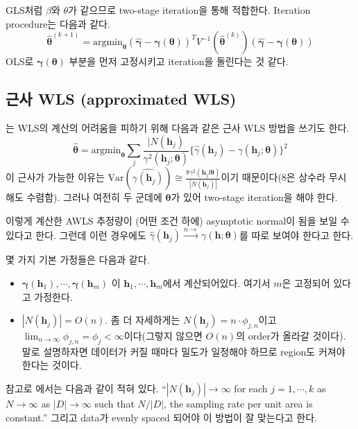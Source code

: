 \documentclass[b5paper,]{scrbook}
\theoremstyle{plain}
\theoremstyle{definition}
\numberwithin{equation}{section}
\begin{document}
GLS처럼 \(\beta\)와 \(\theta\)가 같으므로 two-stage iteration을 통해 적합한다. Iteration procedure는 다음과 같다.
\[\hat{\boldsymbol{\theta}}^{(k+1)}=\text{argmin}_{\boldsymbol{\theta}}(\hat{\boldsymbol{\gamma}}-\boldsymbol{\gamma}(\boldsymbol{\theta}))^{T}V^{-1}(\hat{\boldsymbol{\theta}}^{(k)})(\hat{\boldsymbol{\gamma}}-\boldsymbol{\gamma}(\boldsymbol{\theta}))\]
OLS로 \(\boldsymbol{\gamma}(\boldsymbol{\theta})\) 부분을 먼저 고정시키고 iteration을 돌린다는 것 같다.

\hypertarget{-wls-approximated-wls}{%
\subsection{근사 WLS (approximated WLS)}\label{-wls-approximated-wls}}

\citep{Cressie1985}는 WLS의 계산의 어려움을 피하기 위해 다음과 같은 근사 WLS 방법을 쓰기도 한다.
\[\hat{\boldsymbol{\theta}}=\text{argmin}_{\boldsymbol{\theta}}\sum_{j}\frac{|N(\mathbf{h}_{j})}{\gamma^{2}(\mathbf{h}_{j};\boldsymbol{\theta})}\{ \hat{\gamma}(\mathbf{h}_{j})-\gamma(\mathbf{h}_{j};\boldsymbol{\theta}) \}^{2}\]
이 근사가 가능한 이유는 \(\text{Var}(\hat{\gamma(\mathbf{h}_{j})}) \cong \frac{8 \gamma^{2}(\mathbf{h}_{j}l\boldsymbol{\theta})}{|N(\mathbf{h}_{j})|}\)이기 때문이다(8은 상수라 무시해도 수렴함). 그러나 여전히 두 군데에 \(\boldsymbol{\theta}\)가 있어 two-stage iteration을 해야 한다.

이렇게 계산한 AWLS 추정량이 (어떤 조건 하에) asymptotic normal이 됨을 보일 수 있다고 한다. 그런데 이런 경우에도 \(\hat{\gamma}(\mathbf{h}_{j}) \stackrel{n \rightarrow}{\rightarrow} \gamma(\mathbf{h};\boldsymbol{\theta})\)를 따로 보여야 한다고 한다.

몇 가지 기본 가정들은 다음과 같다.

\begin{itemize}
\item
  \(\mathbf{\gamma}(\mathbf{h}_{1}), \cdots , \mathbf{\gamma}(\mathbf{h}_{m})\) 이 \(\mathbf{h}_{1}, \cdots , \mathbf{h}_{m}\)에서 계산되어있다. 여기서 \(m\)은 고정되어 있다고 가정한다.
\item
  \(|N(\mathbf{h}_{j})|=O(n)\). 좀 더 자세하게는 \(N(\mathbf{h}_{j})=n\cdot \phi_{j,n}\)이고 \(\lim_{n \rightarrow \infty}\phi_{j,n}=\phi_{j} < \infty\)이다(그렇지 않으면 \(O(n)\)의 order가 올라갈 것이다). 말로 설명하자면 데이터가 커질 때마다 밀도가 일정해야 하므로 region도 커져야 한다는 것이다.
\end{itemize}

참고로 \citep{Cressie1985}에서는 다음과 같이 적혀 있다. ``\(|N(\mathbf{h}_{j})| \rightarrow \infty\) for each \(j=1, \cdots, k\) as \(N \rightarrow \infty\) as \(|D| \rightarrow \infty\) such that \(N/|D|\), the sampling rate per unit area is constant.'' 그리고 data가 evenly spaced 되어야 이 방법이 잘 맞는다고 한다.
\end{document}
